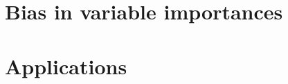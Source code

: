 

\section{Bias in variable importances}
\label{sec:7:bias}




%


\section{Applications}
\label{sec:7:applications}

